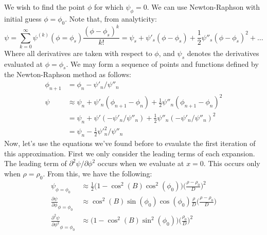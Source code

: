 \documentclass[crop=false,class=book,oneside]{standalone}
\begin{document}
            We wish to find the point $\phi$ for which
            $\psi_{\phi}=0$. We can use Newton-Raphson
            with initial guess
            $\phi=\phi_{0}$. Note that, from analyticity:
            \begin{equation*}
                \psi=\sum_{k=0}^{\infty}
                     \psi^{(k)}(\phi=\phi_{s})
                     \frac{(\phi-\phi_{s})^{k}}{k!}
                    =\psi_{s}+\psi'_{s}(\phi-\phi_{s})
                    +\frac{1}{2}\psi''_{s}(\phi-\phi_{s})^{2}
                    +\hdots
            \end{equation*}
            Where all derivatives are taken with respect to
            $\phi$, and $\psi_{s}$ denotes the derivatives
            evaluated at $\phi=\phi_{s}$.
            We may form a sequence of points and
            functions defined by
            the Newton-Raphson method as follows:
            \begin{align*}
                \phi_{n+1}&=\phi_{n}-\psi'_{n}/\psi''_{n}\\
                \psi&\approx
                \psi_{n}+\psi'_{n}(\phi_{n+1}-\phi_{n})
                +\frac{1}{2}\psi''_{n}(\phi_{n+1}-\phi_{n})^{2}\\
                &=\psi_{n}+\psi'(-\psi'_{n}/\psi''_{n})
                 +\frac{1}{2}
                  \psi''_{n}(-\psi'_{n}/\psi''_{n})^{2}\\
                &=\psi_{n}-\frac{1}{2}\psi'^{2}_{n}/\psi''_{n}
            \end{align*}
            Now, let's use the equations we've found before
            to evaulate the first iteration of this
            approximation. First we only consider the
            leading terms of each expansion. The leading term
            of $\partial^{2}\psi/\partial\phi^{2}$ occurs
            when we evaluate at $x=0$. This occurs only
            when $\rho=\rho_{0}$. From this, we have the
            following:
            \begin{align*}
                \psi_{\phi=\phi_{0}}
                &\approx
                    \frac{1}{2}\big(
                        1-\cos^{2}(B)\cos^{2}(\phi_{0})
                    \big)
                    \Big(\frac{\rho-\rho_{0}}{D}\Big)^{2}\\
                \frac{\partial\psi}
                     {\partial\phi}_{\phi=\phi_{0}}
                &\approx
                    \cos^{2}(B)\sin(\phi_{0})\cos(\phi_{0})
                    \frac{\rho}{D}
                    \Big(\frac{\rho-\rho_{0}}{D}\Big)\\
                \frac{\partial^{2}\psi}
                     {\partial\phi^{2}}_{\phi=\phi_{0}}
                &\approx
                    \big(1-\cos^{2}(B)\sin^{2}(\phi_{0})\big)
                    \Big(\frac{\rho_{0}}{D}\Big)^{2}
            \end{align*}
\end{document}
